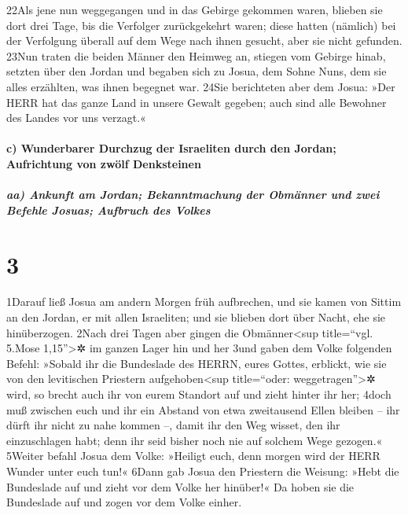 22Als jene nun weggegangen und in das Gebirge gekommen waren, blieben
sie dort drei Tage, bis die Verfolger zurückgekehrt waren; diese hatten
(nämlich) bei der Verfolgung überall auf dem Wege nach ihnen gesucht,
aber sie nicht gefunden. 23Nun traten die beiden Männer den Heimweg an,
stiegen vom Gebirge hinab, setzten über den Jordan und begaben sich zu
Josua, dem Sohne Nuns, dem sie alles erzählten, was ihnen begegnet war.
24Sie berichteten aber dem Josua: »Der HERR hat das ganze Land in unsere
Gewalt gegeben; auch sind alle Bewohner des Landes vor uns verzagt.«

\hypertarget{c-wunderbarer-durchzug-der-israeliten-durch-den-jordan-aufrichtung-von-zwuxf6lf-denksteinen}{%
\paragraph{c) Wunderbarer Durchzug der Israeliten durch den Jordan;
Aufrichtung von zwölf
Denksteinen}\label{c-wunderbarer-durchzug-der-israeliten-durch-den-jordan-aufrichtung-von-zwuxf6lf-denksteinen}}

\hypertarget{aa-ankunft-am-jordan-bekanntmachung-der-obmuxe4nner-und-zwei-befehle-josuas-aufbruch-des-volkes}{%
\subparagraph{aa) Ankunft am Jordan; Bekanntmachung der Obmänner und
zwei Befehle Josuas; Aufbruch des
Volkes}\label{aa-ankunft-am-jordan-bekanntmachung-der-obmuxe4nner-und-zwei-befehle-josuas-aufbruch-des-volkes}}

\hypertarget{section-2}{%
\section{3}\label{section-2}}

1Darauf ließ Josua am andern Morgen früh aufbrechen, und sie kamen von
Sittim an den Jordan, er mit allen Israeliten; und sie blieben dort über
Nacht, ehe sie hinüberzogen. 2Nach drei Tagen aber gingen die
Obmänner\textless sup title=``vgl. 5.Mose 1,15''\textgreater✲ im ganzen
Lager hin und her 3und gaben dem Volke folgenden Befehl: »Sobald ihr die
Bundeslade des HERRN, eures Gottes, erblickt, wie sie von den
levitischen Priestern aufgehoben\textless sup title=``oder:
weggetragen''\textgreater✲ wird, so brecht auch ihr von eurem Standort
auf und zieht hinter ihr her; 4doch muß zwischen euch und ihr ein
Abstand von etwa zweitausend Ellen bleiben -- ihr dürft ihr nicht zu
nahe kommen --, damit ihr den Weg wisset, den ihr einzuschlagen habt;
denn ihr seid bisher noch nie auf solchem Wege gezogen.« 5Weiter befahl
Josua dem Volke: »Heiligt euch, denn morgen wird der HERR Wunder unter
euch tun!« 6Dann gab Josua den Priestern die Weisung: »Hebt die
Bundeslade auf und zieht vor dem Volke her hinüber!« Da hoben sie die
Bundeslade auf und zogen vor dem Volke einher.

